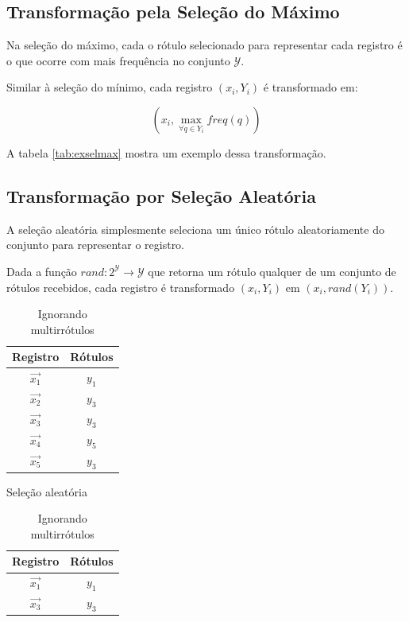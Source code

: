 \documentclass[runningheads,a4paper]{llncs}
\begin{document}
\subsection{Transformação pela Seleção do Máximo} \label{subsec:selecaomaximo}

Na seleção do máximo, cada o rótulo selecionado para representar cada registro é o que ocorre com mais frequência no conjunto $\mathcal{Y}$.

Similar à seleção do mínimo, cada registro $(x_i, Y_i)$ é transformado em:

$$(x_i, \max_{\forall q \in Y_i} freq(q))$$

A tabela \ref{tab:exselmax} mostra um exemplo dessa transformação.

\subsection{Transformação por Seleção Aleatória} \label{subsec:selecaoaleatoria}

A seleção aleatória simplesmente seleciona um único rótulo aleatoriamente do conjunto para representar o registro.

Dada a função $rand : 2^\mathcal{Y} \to \mathcal{Y}$ que retorna um rótulo qualquer de um conjunto de rótulos recebidos, cada registro é transformado $(x_i, Y_i)$ em $(x_i, rand(Y_i))$.

\begin{table}
\parbox{.45\linewidth}{
	\centering
	\begin{tabular}{| c | c |}
		\hline
		\textbf{Registro} & \textbf{Rótulos} \\
		\hline
		$\vec{x_1}$ & $y_1$ \\
		\hline
		$\vec{x_2}$ & $y_3$ \\
		\hline
		$\vec{x_3}$ & $y_3$ \\
		\hline
		$\vec{x_4}$ & $y_5$ \\
		\hline
		$\vec{x_5}$ & $y_3$ \\
		\hline
	\end{tabular}
	\caption{Seleção aleatória}
	\label{tab:exrand}
}
\parbox{.45\linewidth}{
	\centering
	\begin{tabular}{| c | c |}
		\hline
		\textbf{Registro} & \textbf{Rótulos} \\
		\hline
		$\vec{x_1}$ & $y_1$ \\
		\hline
		$\vec{x_3}$ & $y_3$ \\
		\hline
	\end{tabular}
	\caption{Ignorando multirrótulos}
	\label{tab:exignora}
}
\end{table}
\end{document}
